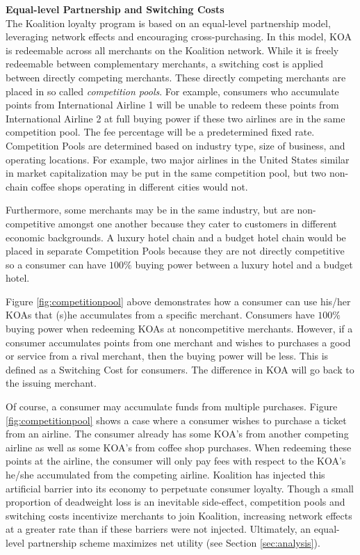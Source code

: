 \noindent \textbf{Equal-level Partnership and Switching Costs} \\
The Koalition loyalty program is based on an equal-level partnership model, leveraging network effects and encouraging cross-purchasing. In this model, KOA is redeemable across all merchants on the Koalition network. While it is freely redeemable between complementary merchants, a switching cost is applied between directly competing merchants. These directly competing merchants are placed in so called \textit{competition pools}. For example, consumers who accumulate points from International Airline 1 will be unable to redeem these points from International Airline 2 at full buying power if these two airlines are in the same competition pool. The fee percentage will be a predetermined fixed rate. Competition Pools are determined based on industry type, size of business, and operating locations. For example, two major airlines in the United States similar in market capitalization may be put in the same competition pool, but two non-chain coffee shops operating in different cities would not.

	
Furthermore, some merchants may be in the same industry, but are non-competitive amongst one another because they cater to customers in different economic backgrounds. A luxury hotel chain and a budget hotel chain would be placed in separate Competition Pools because they are not directly competitive so a consumer can have $100\%$ buying power between a luxury hotel and a budget hotel. 

Figure \ref{fig:competitionpool} above demonstrates how a consumer can use his/her KOAs that (s)he accumulates from a specific merchant. Consumers have $100\%$ buying power when redeeming KOAs at noncompetitive merchants. However, if a consumer accumulates points from one merchant and wishes to purchases a good or service from a rival merchant, then the buying power will be less. This is defined as a Switching Cost for consumers. The difference in KOA will go back to the issuing merchant. 

Of course, a consumer may accumulate funds from multiple purchases. Figure \ref{fig:competitionpool} shows a case where a consumer wishes to purchase a ticket from an airline. The consumer already has some KOA's from another competing airline as well as some KOA's from coffee shop purchases. When redeeming these points at the airline, the consumer will only pay fees with respect to the KOA's he/she accumulated from the competing airline. Koalition has injected this artificial barrier into its economy to perpetuate consumer loyalty. Though a small proportion of deadweight loss is an inevitable side-effect, competition pools and switching costs incentivize merchants to join Koalition, increasing network effects at a greater rate than if these barriers were not injected. Ultimately, an equal-level partnership scheme maximizes net utility (see Section \ref{sec:analysis}).

